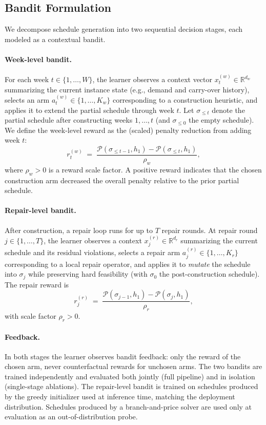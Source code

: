 \documentclass{article}
\begin{document}
\subsection{Bandit Formulation}

We decompose schedule generation into two sequential decision stages, each
modeled as a contextual bandit.

\paragraph{Week-level bandit.}
For each week $t\in\{1,\ldots,W\}$, the learner observes a context vector
$x^{(w)}_t \in \mathbb{R}^{d_w}$ summarizing the current instance state
(e.g., demand and carry-over history), selects an arm
$a^{(w)}_t \in \{1,\ldots,K_w\}$ corresponding to a construction heuristic,
and applies it to extend the partial schedule through week $t$. Let
$\sigma_{\le t}$ denote the partial schedule after constructing weeks
$1,\ldots,t$ (and $\sigma_{\le 0}$ the empty schedule). We define the
week-level reward as the (scaled) penalty reduction from adding week $t$:
\[
r^{(w)}_t
\;=\;
\frac{\mathcal{P}(\sigma_{\le t-1},h_1)-\mathcal{P}(\sigma_{\le t},h_1)}
{\rho_w},
\]
where $\rho_w>0$ is a reward scale factor. A positive reward indicates
that the chosen construction arm decreased the overall penalty relative
to the prior partial schedule.

\paragraph{Repair-level bandit.}
After construction, a repair loop runs for up to $T$ repair rounds. At
repair round $j\in\{1,\ldots,T\}$, the learner observes a context
$x^{(r)}_j \in \mathbb{R}^{d_r}$ summarizing the current schedule and its
residual violations, selects a repair arm
$a^{(r)}_j \in \{1,\ldots,K_r\}$ corresponding to a local repair operator,
and applies it to \emph{mutate} the schedule into $\sigma_j$ while
preserving hard feasibility (with $\sigma_0$ the post-construction
schedule). The repair reward is
\[
r^{(r)}_j
\;=\;
\frac{\mathcal{P}(\sigma_{j-1},h_1)-\mathcal{P}(\sigma_j,h_1)}{\rho_r},
\]
with scale factor $\rho_r>0$.

\paragraph{Feedback.}
In both stages the learner observes bandit feedback: only the reward of
the chosen arm, never counterfactual rewards for unchosen arms. The two
bandits are trained independently and evaluated both jointly (full
pipeline) and in isolation (single-stage ablations). The repair-level
bandit is trained on schedules produced by the greedy initializer used at
inference time, matching the deployment distribution. Schedules produced
by a branch-and-price solver are used only at evaluation as an
out-of-distribution probe.
\end{document}
